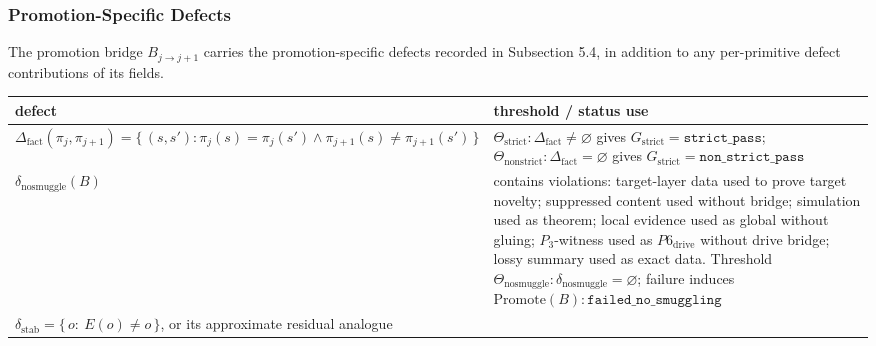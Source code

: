 \documentclass[11pt]{article}
\theoremstyle{definition}
\begin{document}
\subsubsection{Promotion-Specific Defects}

The promotion bridge \(B_{j\to j+1}\) carries the promotion-specific defects recorded in Subsection 5.4, in addition to any per-primitive defect contributions of its fields.

\begin{longtable}[]{@{}ll@{}}
\toprule
\begin{minipage}[b]{0.47\columnwidth}\raggedright
defect\strut
\end{minipage} & \begin{minipage}[b]{0.47\columnwidth}\raggedright
threshold / status use\strut
\end{minipage}\tabularnewline
\midrule
\endhead
\begin{minipage}[t]{0.47\columnwidth}\raggedright
\(\Delta_{\mathrm{fact}}(\pi_j,\pi_{j+1})=\{\,(s,s'):\pi_j(s)=\pi_j(s')\wedge\pi_{j+1}(s)\neq\pi_{j+1}(s')\,\}\)\strut
\end{minipage} & \begin{minipage}[t]{0.47\columnwidth}\raggedright
\(\Theta_{\mathrm{strict}}:\Delta_{\mathrm{fact}}\neq\varnothing\) gives \(G_{\mathrm{strict}}=\texttt{strict\_pass}\); \(\Theta_{\mathrm{nonstrict}}:\Delta_{\mathrm{fact}}=\varnothing\) gives \(G_{\mathrm{strict}}=\texttt{non\_strict\_pass}\)\strut
\end{minipage}\tabularnewline
\begin{minipage}[t]{0.47\columnwidth}\raggedright
\(\delta_{\mathrm{nosmuggle}}(B)\)\strut
\end{minipage} & \begin{minipage}[t]{0.47\columnwidth}\raggedright
contains violations: target-layer data used to prove target novelty; suppressed content used without bridge; simulation used as theorem; local evidence used as global without gluing; \(P_3\)-witness used as \(P6_{\mathrm{drive}}\) without drive bridge; lossy summary used as exact data. Threshold \(\Theta_{\mathrm{nosmuggle}}:\delta_{\mathrm{nosmuggle}}=\varnothing\); failure induces \(\mathrm{Promote}(B):\texttt{failed\_no\_smuggling}\)\strut
\end{minipage}\tabularnewline
\begin{minipage}[t]{0.47\columnwidth}\raggedright
\(\delta_{\mathrm{stab}}=\{\,o:\ E(o)\neq o\,\}\), or its approximate residual analogue\strut
\end{minipage} & \begin{minipage}[t]{0.47\columnwidth}\raggedright

\end{minipage}
\end{longtable}
\end{document}
